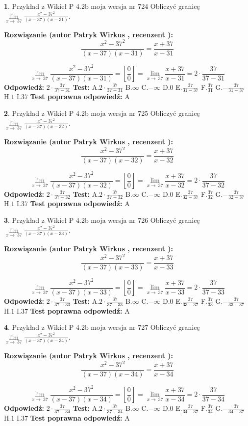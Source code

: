 \documentclass[12pt, a4paper]{article}
\theoremstyle{definition} %
\newtheorem{zad}{}
\newcommand{\zadStart}[1]{\begin{zad}#1\newline}
\newcommand{\zadStop}{\end{zad}}
\newcommand{\rozwStart}[2]{\noindent \textbf{Rozwiązanie (autor #1 , recenzent #2): }\newline}
\newcommand{\rozwStop}{\newline}
\newcommand{\odpStart}{\noindent \textbf{Odpowiedź:}\newline}
\newcommand{\odpStop}{\newline}
\newcommand{\testStart}{\noindent \textbf{Test:}\newline}
\newcommand{\testStop}{\newline}
\newcommand{\kluczStart}{\noindent \textbf{Test poprawna odpowiedź:}\newline}
\newcommand{\kluczStop}{\newline}
\begin{document}
\zadStart{Przykład z Wikieł P 4.2b moja wersja nr 724}
Obliczyć granicę $\lim\limits_{x\to\ 37}\frac{x^{2}-37^{2}}{(x-37)(x-31)}$.
\zadStop
\rozwStart{Patryk Wirkus}{}
$$\frac{x^{2}-37^{2}}{(x-37)(x-31)}=\frac{x+37}{x-31}$$

$$\lim\limits_{x\to\ 37}\frac{x^{2}-37^{2}}{(x-37)(x-31)}=[\frac{0}{0}]=\lim\limits_{x\to\ 37}\frac{x+37}{x-31}=2 \cdot \frac{37}{37-31}$$
\rozwStop
\odpStart
$2 \cdot \frac{37}{37-31}$
\odpStop
\testStart
A.$2 \cdot \frac{37}{37-31}$
B.$\infty$
C.$-\infty$
D.$0$
E.$\frac{37}{31-37}$
F.$\frac{37}{31}$
G.$-\frac{37}{31-37}$
H.$1$
I.$37$
\testStop
\kluczStart
A
\kluczStop



\zadStart{Przykład z Wikieł P 4.2b moja wersja nr 725}
Obliczyć granicę $\lim\limits_{x\to\ 37}\frac{x^{2}-37^{2}}{(x-37)(x-32)}$.
\zadStop
\rozwStart{Patryk Wirkus}{}
$$\frac{x^{2}-37^{2}}{(x-37)(x-32)}=\frac{x+37}{x-32}$$

$$\lim\limits_{x\to\ 37}\frac{x^{2}-37^{2}}{(x-37)(x-32)}=[\frac{0}{0}]=\lim\limits_{x\to\ 37}\frac{x+37}{x-32}=2 \cdot \frac{37}{37-32}$$
\rozwStop
\odpStart
$2 \cdot \frac{37}{37-32}$
\odpStop
\testStart
A.$2 \cdot \frac{37}{37-32}$
B.$\infty$
C.$-\infty$
D.$0$
E.$\frac{37}{32-37}$
F.$\frac{37}{32}$
G.$-\frac{37}{32-37}$
H.$1$
I.$37$
\testStop
\kluczStart
A
\kluczStop



\zadStart{Przykład z Wikieł P 4.2b moja wersja nr 726}
Obliczyć granicę $\lim\limits_{x\to\ 37}\frac{x^{2}-37^{2}}{(x-37)(x-33)}$.
\zadStop
\rozwStart{Patryk Wirkus}{}
$$\frac{x^{2}-37^{2}}{(x-37)(x-33)}=\frac{x+37}{x-33}$$

$$\lim\limits_{x\to\ 37}\frac{x^{2}-37^{2}}{(x-37)(x-33)}=[\frac{0}{0}]=\lim\limits_{x\to\ 37}\frac{x+37}{x-33}=2 \cdot \frac{37}{37-33}$$
\rozwStop
\odpStart
$2 \cdot \frac{37}{37-33}$
\odpStop
\testStart
A.$2 \cdot \frac{37}{37-33}$
B.$\infty$
C.$-\infty$
D.$0$
E.$\frac{37}{33-37}$
F.$\frac{37}{33}$
G.$-\frac{37}{33-37}$
H.$1$
I.$37$
\testStop
\kluczStart
A
\kluczStop



\zadStart{Przykład z Wikieł P 4.2b moja wersja nr 727}
Obliczyć granicę $\lim\limits_{x\to\ 37}\frac{x^{2}-37^{2}}{(x-37)(x-34)}$.
\zadStop
\rozwStart{Patryk Wirkus}{}
$$\frac{x^{2}-37^{2}}{(x-37)(x-34)}=\frac{x+37}{x-34}$$

$$\lim\limits_{x\to\ 37}\frac{x^{2}-37^{2}}{(x-37)(x-34)}=[\frac{0}{0}]=\lim\limits_{x\to\ 37}\frac{x+37}{x-34}=2 \cdot \frac{37}{37-34}$$
\rozwStop
\odpStart
$2 \cdot \frac{37}{37-34}$
\odpStop
\testStart
A.$2 \cdot \frac{37}{37-34}$
B.$\infty$
C.$-\infty$
D.$0$
E.$\frac{37}{34-37}$
F.$\frac{37}{34}$
G.$-\frac{37}{34-37}$
H.$1$
I.$37$
\testStop
\kluczStart
A
\kluczStop
\end{document}
